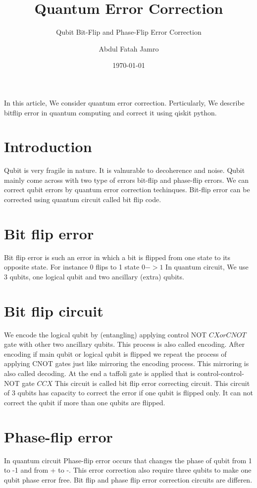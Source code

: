 \documentclass[a4paper, 12pt]{scrartcl}
\title{Quantum Error Correction}
\subtitle{Qubit Bit-Flip and Phase-Flip Error Correction}
\author{Abdul Fatah Jamro}
\date{\today}
\begin{document}
\maketitle
  In this article, We consider quantum error correction. 
  Perticularly, We describe bitflip error in quantum computing 
  and correct it using qiskit python.

\section{Introduction}
  Qubit is very fragile in nature. It is valnurable to decoherence and noise.
  Qubit mainly come across with two type of errors bit-flip and phase-flip errors.
  We can correct qubit errors by quantum error correction techinques. 
  Bit-flip error can be corrected using quantum circuit called bit flip code.

  \section{Bit flip error}
  Bit flip error is such an error in which a bit is flipped from one state to 
  its opposite state. For instance 0 flips to 1 state $0  -> 1$
  In quantum circuit, We use 3 qubits, one logical qubit and two ancillary (extra) qubits.
\section{Bit flip circuit}
  We encode the logical qubit by (entangling) applying control NOT $CX or CNOT$ gate with other two ancillary qubits.
  This process is also called encoding. After encoding if main qubit or logical qubit is flipped
  we repeat the process of applying CNOT gates just like mirroring the encoding process.
  This mirroring is also called decoding. At the end a taffoli gate is applied that is control-control-NOT gate $CCX$
  This circuit is called bit flip error correcting circuit. This circuit of 3 qubits has capacity 
  to correct the error if one qubit is flipped only. It can not correct the qubit if
  more than one qubits are flipped.
\section{Phase-flip error}
  In quantum circuit Phase-flip error occurs that changes the phase of qubit from 1 to -1 and from + to -.
  This error correction also require three qubits to make one qubit phase error free. Bit flip and phase flip error correction circuits are differen.
\end{document}
